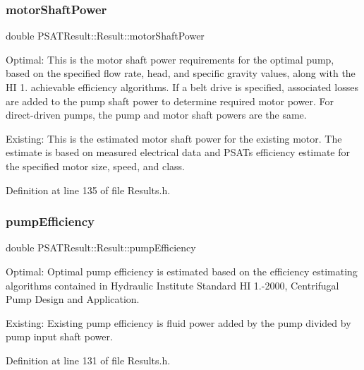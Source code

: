 \subsubsection{\texorpdfstring{motor\+Shaft\+Power}{motorShaftPower}}
{\footnotesize\ttfamily double P\+S\+A\+T\+Result\+::\+Result\+::motor\+Shaft\+Power}



Optimal\+: This is the motor shaft power requirements for the optimal pump, based on the specified flow rate, head, and specific gravity values, along with the HI 1. achievable efficiency algorithms. If a belt drive is specified, associated losses are added to the pump shaft power to determine required motor power. For direct-\/driven pumps, the pump and motor shaft powers are the same. 

Existing\+: This is the estimated motor shaft power for the existing motor. The estimate is based on measured electrical data and P\+S\+AT\textquotesingle{}s efficiency estimate for the specified motor size, speed, and class. 

Definition at line 135 of file Results.\+h.

\mbox{\label{struct_p_s_a_t_result_1_1_result_a6b194eedbd6d31390928e1b4feab922b}} 
\subsubsection{\texorpdfstring{pump\+Efficiency}{pumpEfficiency}}
{\footnotesize\ttfamily double P\+S\+A\+T\+Result\+::\+Result\+::pump\+Efficiency}



Optimal\+: Optimal pump efficiency is estimated based on the efficiency estimating algorithms contained in Hydraulic Institute Standard HI 1.-\/2000, Centrifugal Pump Design and Application. 

Existing\+: Existing pump efficiency is fluid power added by the pump divided by pump input shaft power. 

Definition at line 131 of file Results.\+h.

\mbox{\label{struct_p_s_a_t_result_1_1_result_a6787157a580ee3755910e18e792a4dbf}} 
